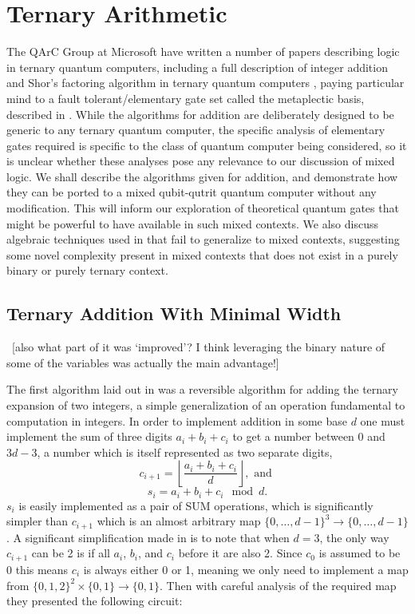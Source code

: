 \chapter[TERNARY ARITHMETIC]{Ternary Arithmetic}
The QArC Group at Microsoft have written a number of papers describing logic in ternary quantum computers, including a full description of integer addition and Shor's factoring algorithm in ternary quantum computers \cite{arithmetics, shor-qutrit}, paying particular mind to a fault tolerant/elementary gate set called the metaplectic basis, described in \cite{universal-anyon, topological-anyon-thing}. While the algorithms for addition are deliberately designed to be generic to any ternary quantum computer, the specific analysis of elementary gates required is specific to the class of quantum computer being considered, so it is unclear whether these analyses pose any relevance to our discussion of mixed logic. We shall describe the algorithms given for addition, and demonstrate how they can be ported to a mixed qubit-qutrit quantum computer without any modification. This will inform our exploration of theoretical quantum gates that might be powerful to have available in such mixed contexts. We also discuss algebraic techniques used in \cite{arithmetics} that fail to generalize to mixed contexts, suggesting some novel complexity present in mixed contexts that does not exist in a purely binary or purely ternary context.

\section{Ternary Addition With Minimal Width}
\ [also what part of it was `improved'? I think leveraging the binary nature of some of the variables was actually the main advantage!]

The first algorithm laid out in \cite{arithmetics} was a reversible algorithm for adding the ternary expansion of two integers, a simple generalization of an operation fundamental to computation in integers. In order to implement addition in some base $d$ one must implement the sum of three digits $a_i + b_i + c_i$ to get a number between $0$ and $3d-3$, a number which is itself represented as two separate digits,
\[c_{i+1} = \left\lfloor \frac{a_i + b_i + c_i}{d} \right\rfloor, \text{\ and\ }
\]\[s_i = a_i + b_i + c_i \mod d.\]
$s_i$ is easily implemented as a pair of SUM operations, which is significantly simpler than $c_{i+1}$ which is an almost arbitrary map $\{0,\dots,d-1\}^3 \to \{0,\dots,d-1\}$. A significant simplification made in \cite{arithmetics} is to note that when $d=3$, the only way $c_{i+1}$ can be 2 is if all $a_i$, $b_i$, and $c_i$ before it are also 2. Since $c_0$ is assumed to be 0 this means $c_i$ is always either 0 or 1, meaning we only need to implement a map from $\{0,1,2\}^2\times\{0,1\} \to \{0, 1\}$. Then with careful analysis of the required map they presented the following circuit:


